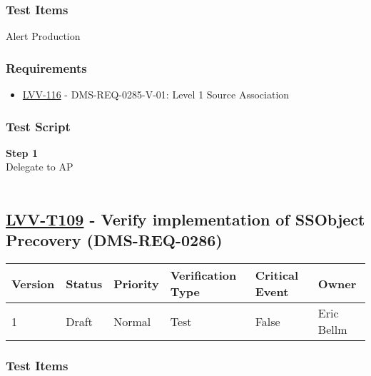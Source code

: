 \hypertarget{test-items-84}{%
\subsubsection{Test Items}\label{test-items-84}}

Alert Production~

\hypertarget{requirements-85}{%
\subsubsection{Requirements}\label{requirements-85}}

\begin{itemize}
\tightlist
\item
  \href{https://jira.lsstcorp.org/browse/LVV-116}{LVV-116} -
  DMS-REQ-0285-V-01: Level 1 Source Association
\end{itemize}

\hypertarget{test-script-85}{%
\subsubsection{Test Script}\label{test-script-85}}

\textbf{Step 1}\\
Delegate to AP\\
~\\

\hypertarget{lvv-t109---verify-implementation-of-ssobject-precovery-dms-req-0286}{%
\subsection{\texorpdfstring{\href{https://jira.lsstcorp.org/secure/Tests.jspa\#/testCase/LVV-T109}{LVV-T109}
- Verify implementation of SSObject Precovery
(DMS-REQ-0286)}{LVV-T109 - Verify implementation of SSObject Precovery (DMS-REQ-0286)}}\label{lvv-t109---verify-implementation-of-ssobject-precovery-dms-req-0286}}

\begin{longtable}[]{@{}llllll@{}}
\toprule
Version & Status & Priority & Verification Type & Critical Event &
Owner\tabularnewline
\midrule
\endhead
1 & Draft & Normal & Test & False & Eric Bellm\tabularnewline
\bottomrule
\end{longtable}

\hypertarget{test-items-85}{%
\subsubsection{Test Items}\label{test-items-85}}

